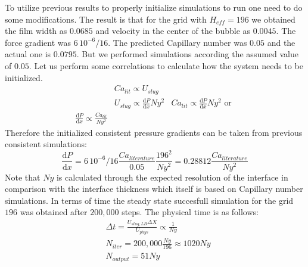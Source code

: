 \documentclass{article}
\begin{document}
To utilize previous results to properly initialize simulations to run one need
to do some modifications. The result is that for the grid with $H_{eff}=196$ we
obtained the film width as $0.0685$ and velocity in the center of the bubble as
$0.0045$. The force gradient was $6\, 10^{-6} /16$. The predicted Capillary
number was $0.05$ and the actual one is $0.0795$. But we performed simulations
according the assumed value of $0.05$. Let us perform some correlations to
calculate how the system needs to be initialized. 
\begin{equation}
\begin{aligned}
&Ca_{lit} \propto U_{slug}\\
&U_{slug} \propto \frac{\mathrm{d}P}{\mathrm{d}x} Ny^2 
&Ca_{lit} \propto \frac{\mathrm{d}P}{\mathrm{d} x} Ny^2 \text{ or }\\
\frac{\mathrm{d}P}{\mathrm{d} x} \propto \frac{Ca_{lit}}{Ny^2}
\end{aligned}
\end{equation}
Therefore the initialized consistent pressure gradients can be taken from
previous consistent simulations:
\begin{equation}
\frac{\mathrm{d}P}{\mathrm{d} x}=6\,10^{-6}/16 \frac{Ca_{literature}}{0.05}
\frac{196^2}{Ny^2}=0.28812 \frac{Ca_{literature}}{Ny^2}
\end{equation}
Note that $Ny$ is calculated through the expected resolution of the interface
in comparison with the interface thickness which itself is based on
Capillary number simulations. In terms of time the steady state succesfull
simulation for the grid $196$ was obtained after $200,000$ steps. The physical
time is as follows:
\begin{equation}
\begin{aligned}
&\Delta t=\frac{U_{slug,LB} \Delta X}{U_{phys}} \propto \frac{1}{Ny}\\
&N_{iter}=200,000 \frac{Ny}{196}\approx 1020 Ny\\
&N_{output}=51 Ny\\
\end{aligned}
\end{equation}
\end{document}
